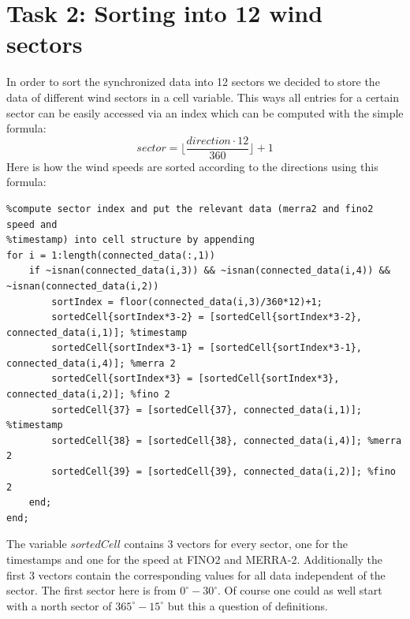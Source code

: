 \documentclass[10pt]{article}
\newcommand\floor[1]{\lfloor#1\rfloor}
\begin{document}
\section{Task 2: Sorting into 12 wind sectors}
In order to sort the synchronized data into 12 sectors we decided to store the data of different wind sectors in a cell variable. This ways all entries for a certain sector can be easily accessed via an index which can be computed with the simple formula:
\begin{equation*}
 sector = \floor{\frac{direction \cdot 12}{360}}+1 
\end{equation*}
Here is how the wind speeds are sorted according to the directions using this formula:
\begin{lstlisting}
%compute sector index and put the relevant data (merra2 and fino2 speed and
%timestamp) into cell structure by appending
for i = 1:length(connected_data(:,1))
    if ~isnan(connected_data(i,3)) && ~isnan(connected_data(i,4)) && ~isnan(connected_data(i,2))
        sortIndex = floor(connected_data(i,3)/360*12)+1;
        sortedCell{sortIndex*3-2} = [sortedCell{sortIndex*3-2}, connected_data(i,1)]; %timestamp
        sortedCell{sortIndex*3-1} = [sortedCell{sortIndex*3-1}, connected_data(i,4)]; %merra 2
        sortedCell{sortIndex*3} = [sortedCell{sortIndex*3}, connected_data(i,2)]; %fino 2
        sortedCell{37} = [sortedCell{37}, connected_data(i,1)]; %timestamp
        sortedCell{38} = [sortedCell{38}, connected_data(i,4)]; %merra 2
        sortedCell{39} = [sortedCell{39}, connected_data(i,2)]; %fino 2
    end;
end;
\end{lstlisting} 
The variable $sortedCell$ contains 3 vectors for every sector, one for the timestamps and one for the speed at FINO2 and MERRA-2. Additionally the first 3 vectors contain the corresponding values for all data independent of the sector.
The first sector here is from $0^{\circ}-30^{\circ}$. Of course one could as well start with a north sector of $365^{\circ}-15^{\circ}$ but this a question of definitions.
\end{document}
